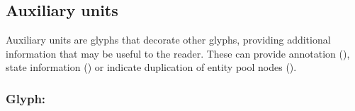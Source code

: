 



\subsection{Auxiliary units}

Auxiliary units are glyphs that decorate other glyphs, providing additional information that may be useful to the reader. These can provide annotation (), state information () or indicate duplication of entity pool nodes ().

\subsubsection{Glyph: }
\label{sec:unitInfo}

